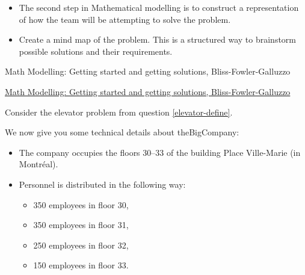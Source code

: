 \begin{lesson}

	\begin{itemize}
		\item The second step in Mathematical modelling is to construct a representation of how the team will be attempting to solve the problem.
		\item Create a mind map of the problem. This is a structured way to brainstorm possible solutions and their requirements.
	\end{itemize}
	

\begin{annotation}
	\begin{goals}
	Math Modelling: Getting started and getting solutions, Bliss-Fowler-Galluzzo
	
	\hfill {}	
	\end{goals}
\end{annotation}
	 \href{https://m3challenge.siam.org/resources/modeling-handbook}{Math Modelling: Getting started and getting solutions, Bliss-Fowler-Galluzzo}

\end{lesson}




\newpage

\question
\label{elevator-assumptions}
Consider the elevator problem from question \ref{elevator-define}. 

We now give you some technical details about theBigCompany:


\begin{itemize}
	\item The company occupies the floors 30--33 of the building Place Ville-Marie (in Montr\'eal).

	\item Personnel is distributed in the following way: 
	\begin{itemize}
		\item 350 employees in floor 30,
		\item 350 employees in floor 31,
		\item 250 employees in floor 32, 
		\item 150 employees in floor 33.
	\end{itemize}
\end{itemize}

